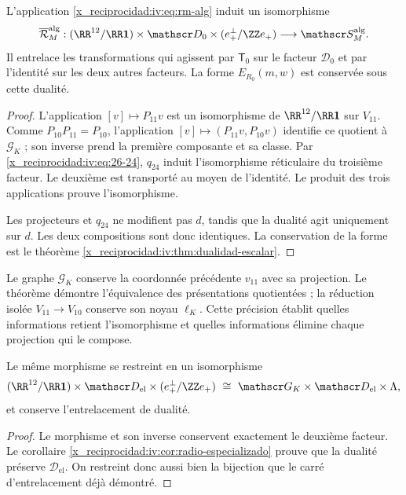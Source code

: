 \begin{theorem}
\label{x_reciprocidad:iv:thm:pantallas-isomorfas}
\label{x_reciprocidad:thm:k-pantallas-coordinadas}
L’application \eqref{x_reciprocidad:iv:eq:rm-alg} induit un isomorphisme
\[
 \overline{\mathcal R}_M^{\mathrm{alg}}:
 (\RR^{12}/\RR\mathbf1)\times\mathscr D_0
 \times(e_+^\perp/\ZZ e_+)
 \longrightarrow\mathscr S_M^{\mathrm{alg}}.
\]
Il entrelace les transformations qui agissent par \(\mathsf T_0\)
sur le facteur \(\mathscr D_0\) et par l’identité sur les
deux autres facteurs. La forme \(E_{R_0}(m,w)\) est conservée
sous cette dualité.
\end{theorem}
\begin{proof}
L’application \([v]\mapsto P_{11}v\) est un isomorphisme
de \(\RR^{12}/\RR\mathbf1\) sur \(V_{11}\).
Comme \(P_{10}P_{11}=P_{10}\), l’application
\([v]\mapsto(P_{11}v,P_{10}v)\) identifie ce quotient
à \(\mathscr G_K\) ; son inverse prend la première composante
et sa classe. Par \eqref{x_reciprocidad:iv:eq:26-24}, \(q_{24}\) induit
l’isomorphisme réticulaire du troisième facteur. Le deuxième est
transporté au moyen de l’identité. Le produit des trois
applications prouve l’isomorphisme.

Les projecteurs et \(q_{24}\) ne modifient pas \(d\), tandis que
la dualité agit uniquement sur \(d\). Les deux
compositions sont donc identiques. La conservation de la forme
est le théorème \ref{x_reciprocidad:iv:thm:dualidad-escalar}.
\end{proof}

Le graphe \(\mathscr G_K\) conserve la coordonnée précédente
\(v_{11}\) avec sa projection. Le théorème démontre
l’équivalence des présentations quotientées ; la réduction
isolée \(V_{11}\to V_{10}\) conserve son noyau
\(\ell_K\). Cette précision établit quelles informations
retient l’isomorphisme et quelles informations élimine chaque
projection qui le compose.

\begin{corollary}
Le même morphisme se restreint en un isomorphisme
\[
 (\RR^{12}/\RR\mathbf1)\times\mathscr D_{\mathrm{el}}
 \times(e_+^\perp/\ZZ e_+)
 \ \cong\ \mathscr G_K\times\mathscr D_{\mathrm{el}}\times\Lambda,
\]
et conserve l’entrelacement de dualité.
\end{corollary}
\begin{proof}
Le morphisme et son inverse conservent exactement le deuxième facteur.
Le corollaire \ref{x_reciprocidad:iv:cor:radio-especializado} prouve que la dualité
préserve \(\mathscr D_{\mathrm{el}}\). On restreint donc
aussi bien la bijection que le carré d’entrelacement déjà démontré.
\end{proof}

